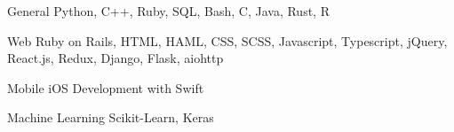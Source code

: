 


\begin{cvskills}


  \cvskill
  {General}
  {Python, C++, Ruby, SQL, Bash, C, Java, Rust, R}


  \cvskill
  {Web}
  {Ruby on Rails, HTML, HAML, CSS, SCSS, Javascript, Typescript, jQuery, React.js, Redux, Django, Flask, aiohttp}


  \cvskill
  {Mobile}
  {iOS Development with Swift}


  \cvskill
  {Machine Learning}
  {Scikit-Learn, Keras}

\end{cvskills}
